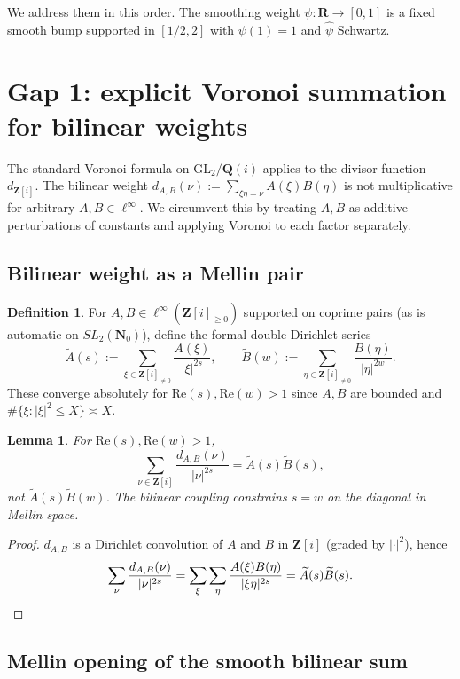 \documentclass[11pt]{article}
\newtheorem{lemma}[theorem]{Lemma}
\theoremstyle{definition}
\newtheorem{definition}[theorem]{Definition}
\newcommand{\Nz}{\mathbf{N}_0}
\newcommand{\Z}{\mathbf{Z}}
\newcommand{\Q}{\mathbf{Q}}
\newcommand{\R}{\mathbf{R}}
\newcommand{\Zi}{\Z[i]}
\newcommand{\SLNz}{SL_2(\Nz)}
\renewcommand{\Re}{\mathrm{Re}}
\begin{document}
We address them in this order. The smoothing weight $\psi:\R\to[0,1]$ is a fixed smooth bump supported in $[1/2,2]$ with $\psi(1)=1$ and $\widehat\psi$ Schwartz.

\section{Gap 1: explicit Voronoi summation for bilinear weights}\label{sec:gap1}

The standard Voronoi formula on $\mathrm{GL}_2/\Q(i)$ applies to the divisor function $d_{\Zi}$. The bilinear weight $d_{A,B}(\nu):=\sum_{\xi\eta=\nu}A(\xi)B(\eta)$ is not multiplicative for arbitrary $A,B\in\ell^\infty$. We circumvent this by treating $A,B$ as additive perturbations of constants and applying Voronoi to each factor separately.

\subsection{Bilinear weight as a Mellin pair}

\begin{definition}\label{def:mellin-pair}
For $A,B\in\ell^\infty(\Zi_{\ge 0})$ supported on coprime pairs (as is automatic on $\SLNz$), define the formal double Dirichlet series
\[
\widetilde A(s):=\sum_{\xi\in\Zi_{\ne 0}}\frac{A(\xi)}{|\xi|^{2s}},\qquad \widetilde B(w):=\sum_{\eta\in\Zi_{\ne 0}}\frac{B(\eta)}{|\eta|^{2w}}.
\]
These converge absolutely for $\Re(s),\Re(w)>1$ since $A,B$ are bounded and $\#\{\xi:|\xi|^2\le X\}\asymp X$.
\end{definition}

\begin{lemma}\label{lem:dirichlet-product}
For $\Re(s),\Re(w)>1$,
\[
\sum_{\nu\in\Zi}\frac{d_{A,B}(\nu)}{|\nu|^{2s}}=\widetilde A(s)\widetilde B(s),
\]
not $\widetilde A(s)\widetilde B(w)$. The bilinear coupling constrains $s=w$ on the diagonal in Mellin space.
\end{lemma}

\begin{proof}
$d_{A,B}$ is a Dirichlet convolution of $A$ and $B$ in $\Zi$ (graded by $|\cdot|^2$), hence
\[
\sum_\nu\frac{d_{A,B}(\nu)}{|\nu|^{2s}}=\sum_\xi\sum_\eta\frac{A(\xi)B(\eta)}{|\xi\eta|^{2s}}=\widetilde A(s)\widetilde B(s).\qedhere
\]
\end{proof}

\subsection{Mellin opening of the smooth bilinear sum}
\end{document}
